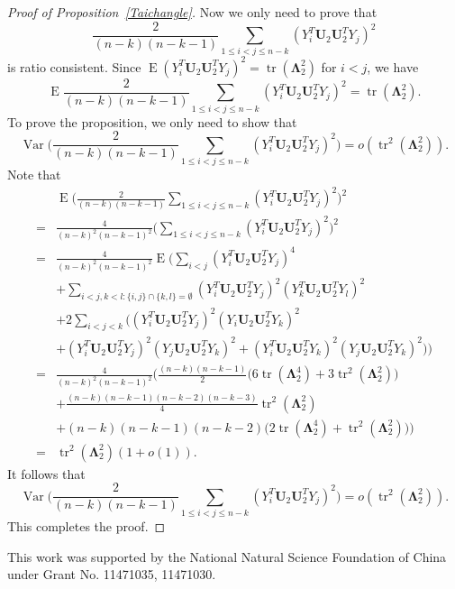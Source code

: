 \documentclass[12pt]{article} %
\DeclareMathOperator{\mytr}{tr}
\DeclareMathOperator{\myE}{E}
\DeclareMathOperator{\myVar}{Var}
\newcommand{\bU}{\mathbf{U}}
\newcommand{\bfsym}[1]{\ensuremath{\boldsymbol{#1}}}
\def\bLambda {\bfsym {\Lambda}}
\theoremstyle{definition}
\begin{document}
\begin{appendices}
\begin{proof}[Proof of Proposition~\ref{Taichangle}]
        Now we only need to prove that
        $$
    \frac{2}{(n-k)(n-k-1)}\sum_{1\leq i<j\leq n-k}(Y_i^T \bU_2 \bU_2^T Y_j)^2 
        $$
        is ratio consistent.
        Since $\myE (Y_i^T \bU_2 \bU_2^T Y_j)^2=\mytr(\bLambda_2^2)$ for $i< j$, we have
    $$
        \myE
    \frac{2}{(n-k)(n-k-1)}\sum_{1\leq i<j\leq n-k}(Y_i^T \bU_2 \bU_2^T Y_j)^2 
        =\mytr(\bLambda_2^2).
        $$
        To prove the proposition, we only need to show that 
        $$
        \myVar
    \Big(
    \frac{2}{(n-k)(n-k-1)}\sum_{1\leq i<j\leq n-k}(Y_i^T \bU_2 \bU_2^T Y_j)^2 
    \Big)
        =o(\mytr^2(\bLambda_2^2)).
        $$
         Note that
         $$
        \begin{aligned}
            &\myE\Big(
    \frac{2}{(n-k)(n-k-1)}\sum_{1\leq i<j\leq n-k}(Y_i^T \bU_2 \bU_2^T Y_j)^2 
            \Big)^2\\
            =&
            \frac{4}{(n-k)^2(n-k-1)^2}\Big(\sum_{1\leq i < j\leq n-k}(Y_i^T \bU_2 \bU_2^T Y_j)^2\Big)^2\\
            =&
            \frac{4}{(n-k)^2(n-k-1)^2}\myE\Big( \sum_{i<j}(Y_i^T\bU_2 \bU_2^T Y_j)^4\\
            &+
            \sum_{i<j,k<l:\{i,j\}\cap\{k,l\}=\emptyset}(Y_i^T\bU_2 \bU_2^T Y_j)^2 (Y_k^T\bU_2 \bU_2^T Y_l)^2\\
            &+2\sum_{i<j<k}\big((Y_i^T\bU_2 \bU_2^T Y_j)^2(Y_i\bU_2 \bU_2^T Y_k)^2\\
            &+(Y_i^T\bU_2 \bU_2^T Y_j)^2(Y_j\bU_2 \bU_2^T Y_k)^2+(Y_i^T\bU_2 \bU_2^T Y_k)^2(Y_j\bU_2 \bU_2^T Y_k)^2\big) \Big)\\
            =&
    \frac{4}{(n-k)^2(n-k-1)^2}\Big(
            \frac{(n-k)(n-k-1)}{2}\big(6\mytr(\bLambda_2^4)+3\mytr^2(\bLambda_2^2)\big)\\
            &+\frac{(n-k)(n-k-1)(n-k-2)(n-k-3)}{4}\mytr^2(\bLambda_2^2)\\
            &+(n-k)(n-k-1)(n-k-2)\big(2\mytr(\bLambda_2^4)
            +\mytr^2(\bLambda_2^2)\big)
            \Big)\\
            =&
            \mytr^2(\bLambda_2^2)(1+o(1)).
        \end{aligned}
         $$
        It follows that
        $$
        \myVar
    \Big(\frac{2}{(n-k)(n-k-1)}\sum_{1\leq i<j\leq n-k}(Y_i^T \bU_2 \bU_2^T Y_j)^2 
    \Big)
            =
            o(\mytr^2(\bLambda_2^2)).
        $$
        This completes the proof.
\end{proof}

\end{appendices}
%
\vskip 14pt
This work was supported by the National Natural Science Foundation of
China under Grant No. 11471035, 11471030.
\par
\end{document}
